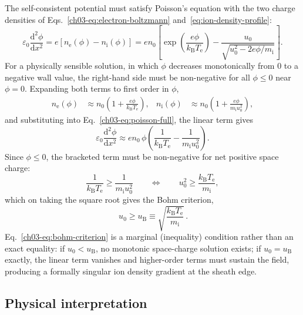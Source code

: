 The self-consistent potential must satisfy Poisson's equation with the two charge densities of Eqs.~\eqref{ch03-eq:electron-boltzmann} and~\eqref{eq:ion-density-profile}:
\begin{equation}
\varepsilon_{0} \frac{\mathrm{d}^{2} \phi}{\mathrm{d} x^{2}} = e \left[ n_{\mathrm{e}}(\phi) - n_{\mathrm{i}}(\phi) \right] = e n_{0} \left[ \exp\!\left(\frac{e\phi}{k_{\mathrm{B}} T_{\mathrm{e}}}\right) - \frac{u_{0}}{\sqrt{u_{0}^{2} - 2e\phi/m_{\mathrm{i}}}} \right].
\label{ch03-eq:poisson-full}
\end{equation}
For a physically sensible solution, in which $\phi$ decreases monotonically from $0$ to a negative wall value, the right-hand side must be non-negative for all $\phi\le0$ near $\phi=0$. Expanding both terms to first order in $\phi$,
\begin{align}
n_{\mathrm{e}}(\phi) &\approx n_{0}\left(1 + \frac{e\phi}{k_{\mathrm{B}} T_{\mathrm{e}}}\right), &
n_{\mathrm{i}}(\phi) &\approx n_{0}\left(1 + \frac{e\phi}{m_{\mathrm{i}} u_{0}^{2}}\right),
\end{align}
and substituting into Eq.~\eqref{ch03-eq:poisson-full}, the linear term gives
\begin{equation}
\varepsilon_{0} \frac{\mathrm{d}^{2}\phi}{\mathrm{d} x^{2}} \approx e n_{0}\, \phi\left( \frac{1}{k_{\mathrm{B}} T_{\mathrm{e}}} - \frac{1}{m_{\mathrm{i}} u_{0}^{2}} \right).
\label{eq:linearized-poisson}
\end{equation}
Since $\phi\le0$, the bracketed term must be non-negative for net positive space charge:
\begin{equation}
\frac{1}{k_{\mathrm{B}} T_{\mathrm{e}}} \ge \frac{1}{m_{\mathrm{i}} u_{0}^{2}} \qquad \Longleftrightarrow \qquad u_{0}^{2} \ge \frac{k_{\mathrm{B}} T_{\mathrm{e}}}{m_{\mathrm{i}}},
\end{equation}
which on taking the square root gives the Bohm criterion,
\begin{equation}
\boxed{\, u_{0} \ge u_{\mathrm{B}} \equiv \sqrt{\frac{k_{\mathrm{B}} T_{\mathrm{e}}}{m_{\mathrm{i}}}} \,}.
\label{ch03-eq:bohm-criterion}
\end{equation}
Eq.~\eqref{ch03-eq:bohm-criterion} is a marginal (inequality) condition rather than an exact equality: if $u_0 < u_{\mathrm B}$, no monotonic space-charge solution exists; if $u_0 = u_{\mathrm B}$ exactly, the linear term vanishes and higher-order terms must sustain the field, producing a formally singular ion density gradient at the sheath edge.

\subsection{Physical interpretation}


